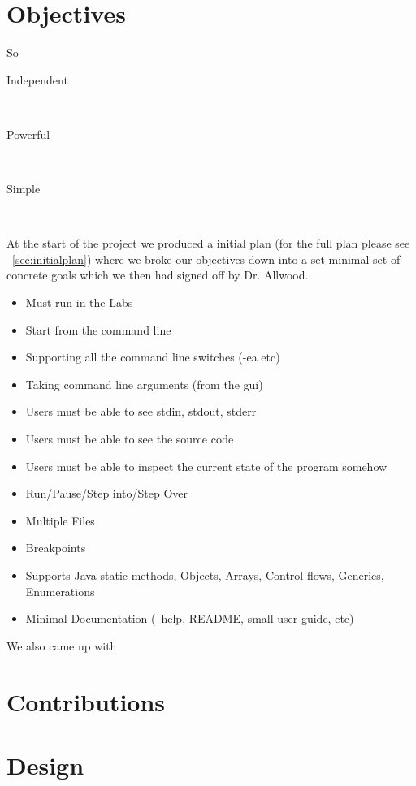 \documentclass[11pt, a4paper]{article}
\begin{document}
\section{Objectives}

So 

\begin{description}
\item[Independent] \hfill \\
\item[Powerful] \hfill \\
\item[Simple] \hfill \\
\end{description}

At the start of the project we produced a initial plan (for the full plan please see ~\cref{sec:initialplan}) where we broke our objectives down into a set minimal set of concrete goals which we then had signed off by Dr. Allwood.

\begin{itemize}
\item Must run in the Labs
\item Start from the command line
\item Supporting all the command line switches (-ea etc)
\item Taking command line arguments (from the gui)
\item Users must be able to see stdin, stdout, stderr
\item Users must be able to see the source code
\item Users must be able to inspect the current state of the program somehow
\item Run/Pause/Step into/Step Over
\item Multiple Files
\item Breakpoints
\item Supports Java static methods, Objects, Arrays, Control flows, Generics, Enumerations
\item Minimal Documentation (--help, README, small user guide, etc)
\end{itemize}

We also came up with 


\section{Contributions}
\section{Design}
\end{document}
